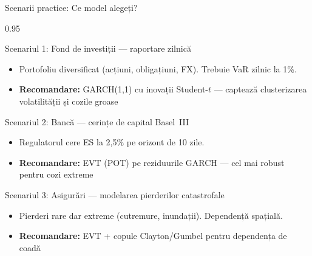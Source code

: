 \documentclass[9pt, aspectratio=169, t]{beamer}
\begin{document}
\begin{frame}{Scenarii practice: Ce model alegeți?}
    \begin{cminipage}{0.95\textwidth}
\begin{block}{Scenariul 1: Fond de investiții --- raportare zilnică}
\begin{itemize}\setlength{\itemsep}{0pt}
    \item Portofoliu diversificat (acțiuni, obligațiuni, FX). Trebuie VaR zilnic la 1\%.
    \item \textbf{Recomandare:} GARCH(1,1) cu inovații Student-$t$ --- captează clusterizarea volatilității și cozile groase
\end{itemize}
\end{block}

\begin{exampleblock}{Scenariul 2: Bancă --- cerințe de capital Basel~III}
\begin{itemize}\setlength{\itemsep}{0pt}
    \item Regulatorul cere ES la 2{,}5\% pe orizont de 10 zile.
    \item \textbf{Recomandare:} EVT (POT) pe reziduurile GARCH --- cel mai robust pentru cozi extreme
\end{itemize}
\end{exampleblock}

\begin{alertblock}{Scenariul 3: Asigurări --- modelarea pierderilor catastrofale}
\begin{itemize}\setlength{\itemsep}{0pt}
    \item Pierderi rare dar extreme (cutremure, inundații). Dependență spațială.
    \item \textbf{Recomandare:} EVT + copule Clayton/Gumbel pentru dependența de coadă
\end{itemize}
\end{alertblock}
    \end{cminipage}
\end{frame}
\end{document}
